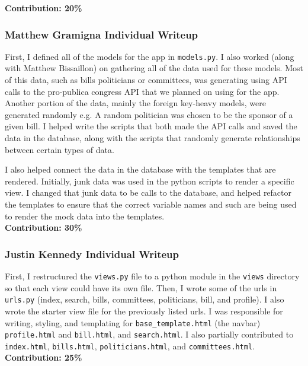 \documentclass{article}
\newcommand{\n}{\noindent}
\begin{document}
\n\textbf{Contribution: 20\%}
\pagebreak

\subsubsection*{Matthew Gramigna Individual Writeup}

First, I defined all of the models for the app in \verb|models.py|. I also worked (along with Matthew Bissaillon) on gathering all of the data used for these models. Most of this data, such as bills politicians or committees, was generating using API calls to the pro-publica congress API that we planned on using for the app.  Another portion of the data, mainly the foreign key-heavy models, were generated randomly e.g. A random politician was chosen to be the sponsor of a given bill. I helped write the scripts that both made the API calls and saved the data in the database, along with the scripts that randomly generate relationships between certain types of data.

I also helped connect the data in the database with the templates that are rendered. Initially, junk data was used in the python scripts to render a specific view. I changed that junk data to be calls to the database, and helped refactor the templates to ensure that the correct variable names and such are being used to render the mock data into the templates. \\

\n\textbf{Contribution: 30\%}

\pagebreak

\subsubsection*{Justin Kennedy Individual Writeup}

First, I restructured the \verb|views.py| file to a python module in the \verb|views| directory so that each view could have its own file.  Then, I wrote some of the urls in \verb|urls.py| (index, search, bills, committees, politicians, bill, and profile).  I also wrote the starter view file for the previously listed urls.  I was responsible for writing, styling, and templating for \verb|base_template.html| (the navbar) \verb|profile.html| and \verb|bill.html|, and \verb|search.html|.  I also partially contributed to \verb|index.html|, \verb|bills.html|, \verb|politicians.html|, and \verb|committees.html|.\\

\n\textbf{Contribution: 25\%}
\end{document}
